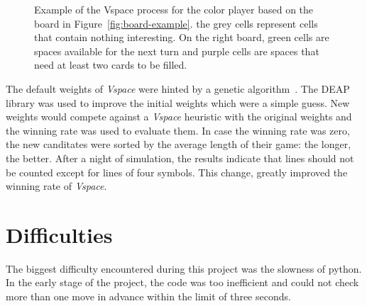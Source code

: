 \documentclass[runningheads]{llncs}
\begin{document}
\begin{figure}[ht]
		\caption{Example of the Vspace process for the
		color player based on the board in
		Figure~\ref{fig:board-example}. the grey cells
		represent cells that contain nothing
		interesting. On the right board, green cells
		are spaces available for the next turn and
		purple cells are spaces that need at least two
		cards to be filled.}
		\label{fig:color-vspace}
\end{figure}

The default weights of \textit{Vspace} were hinted
by a genetic algorithm~\cite{genetic}. The DEAP~\cite{deap}
library was used to improve the initial weights
which were a simple guess.  New weights would
compete against a \textit{Vspace} heuristic with
the original weights and the winning rate was used
to evaluate them. In case the winning rate was
zero, the new canditates were sorted by the
average length of their game: the longer, the
better. After a night of simulation, the results
indicate that lines should not be counted except
for lines of four symbols.  This change,
greatly improved the winning rate of
\textit{Vspace}.

\clearpage
\section{Difficulties}
The biggest difficulty encountered during this
project was the slowness of python. In the early
stage of the project, the code was
too inefficient and could not check more than one
move in advance within the limit of three seconds. 
\end{document}
